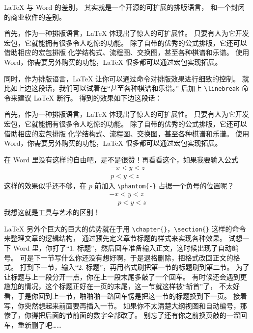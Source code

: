 \LaTeX{} 与 Word 的差别，
其实就是一个开源的可扩展的排版语言，
和一个封闭的商业软件的差别。

首先，作为一种排版语言，\LaTeX{} 体现出了惊人的可扩展性。
只要有人为它开发宏包，它就能拥有很多令人吃惊的功能。
除了自带的优秀的公式排版，它还可以借助相应的宏包排版
化学结构式、流程图、交换图，甚至各种棋谱和乐谱。
使用 Word，你需要另外购买的功能，\LaTeX{} 很多都可以通过宏包实现拓展。

同时，作为排版语言，\LaTeX{} 让你可以通过命令对排版效果进行细致的控制。
就比如上边这段话，我们可以试着在“甚至各种棋谱和乐谱。”
后加上 \verb|\linebreak| 命令来建议 \LaTeX{} 断行。
得到的效果如下边这段话：

首先，作为一种排版语言，\LaTeX{} 体现出了惊人的可扩展性。
只要有人为它开发宏包，它就能拥有很多令人吃惊的功能。
除了自带的优秀的公式排版，它还可以借助相应的宏包排版
化学结构式、流程图、交换图，甚至各种棋谱和乐谱。\linebreak
使用 Word，你需要另外购买的功能，\LaTeX{} 很多都可以通过宏包实现拓展。

在 Word 里没有这样的自由吧，是不是很赞！再看看这个，如果我要输入公式
\begin{gather*}
  -x<y<z \\ p<y<z
\end{gather*}
这样的效果似乎还不够，在 $p$ 前加入 \verb|\phantom{-}| 占据一个负号的位置呢？
\begin{gather*}
  -x<y<z \\ \phantom{-}p<y<z
\end{gather*}
我想这就是工具与艺术的区别！

\LaTeX{} 另外个巨大的巨大的优势就在于用
\verb|\chapter{}|，\verb|\section{}| 这样的命令来整理文章的逻辑结构，
通过预先定义章节标题的样式来实现各种效果。
试想一下 Word 里，你打了“1. 标题”，然后回车准备输入正文，这时候出现了自动编号。
可是下一节写什么你还没有想好啊，于是退格删除，把格式改回正文的格式。
打到下一节，输入“2. 标题”，再用格式刷把第一节的标题刷到第二节。
为了让标题与上一段分开一点，你在上一段末尾多敲了一个回车。
有时候还会遇到更尴尬的情况，这个标题正好在一页的末尾，这一节就这样被“斩首”了，
不太好看，于是你回到上一节，啪啪啪一路回车愣是把这一节的标题换到下一页。
接着写，你突然想起来前面要再插入一节。
如果你不太清楚大纲视图和自动编号，那惨了，你得把后面的节前面的数字全部改了。
别忘了还有你之前换页敲的一溜回车，重新删了吧……


